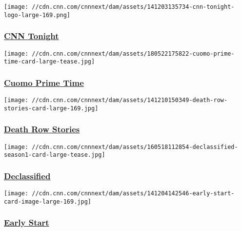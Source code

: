 \href{/shows/cnn-tonight}{}

\texttt{[image: //cdn.cnn.com/cnnnext/dam/assets/141203135734-cnn-tonight-logo-large-169.png]}

\hypertarget{cnn-tonight}{%
\subsubsection{\texorpdfstring{\href{/shows/cnn-tonight}{CNN
Tonight}}{CNN Tonight}}\label{cnn-tonight}}

\href{/shows/cuomo-prime-time}{}

\texttt{[image: //cdn.cnn.com/cnnnext/dam/assets/180522175822-cuomo-prime-time-card-large-tease.jpg]}

\hypertarget{cuomo-prime-time-}{%
\subsubsection{\texorpdfstring{\href{/shows/cuomo-prime-time}{Cuomo
Prime Time }}{Cuomo Prime Time }}\label{cuomo-prime-time-}}

\href{/shows/death-row-stories}{}

\texttt{[image: //cdn.cnn.com/cnnnext/dam/assets/141210150349-death-row-stories-card-large-169.jpg]}

\hypertarget{death-row-stories}{%
\subsubsection{\texorpdfstring{\href{/shows/death-row-stories}{Death Row
Stories}}{Death Row Stories}}\label{death-row-stories}}

\href{/shows/declassified}{}

\texttt{[image: //cdn.cnn.com/cnnnext/dam/assets/160518112854-declassified-season1-card-large-tease.jpg]}

\hypertarget{declassified}{%
\subsubsection{\texorpdfstring{\href{/shows/declassified}{Declassified}}{Declassified}}\label{declassified}}

\href{/shows/early-start}{}

\texttt{[image: //cdn.cnn.com/cnnnext/dam/assets/141204142546-early-start-card-image-large-169.jpg]}

\hypertarget{early-start}{%
\subsubsection{\texorpdfstring{\href{/shows/early-start}{Early
Start}}{Early Start}}\label{early-start}}

